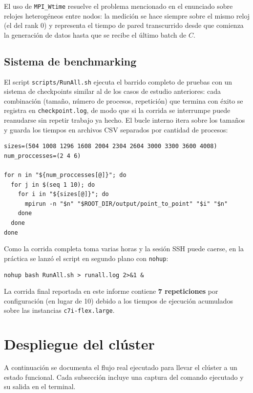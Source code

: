 \documentclass{article}
\begin{document}
El uso de \texttt{MPI\_Wtime} resuelve el problema mencionado en el enunciado sobre relojes heterogéneos entre nodos: la medición se hace siempre sobre el mismo reloj (el del rank 0) y representa el tiempo de pared transcurrido desde que comienza la generación de datos hasta que se recibe el último batch de $C$.

\subsection{Sistema de benchmarking}

El script \texttt{scripts/RunAll.sh} ejecuta el barrido completo de pruebas con un sistema de checkpoints similar al de los casos de estudio anteriores: cada combinación (tamaño, número de procesos, repetición) que termina con éxito se registra en \texttt{checkpoint.log}, de modo que si la corrida se interrumpe puede reanudarse sin repetir trabajo ya hecho. El bucle interno itera sobre los tamaños y guarda los tiempos en archivos CSV separados por cantidad de procesos:

\begin{verbatim}
sizes=(504 1008 1296 1608 2004 2304 2604 3000 3300 3600 4008)
num_proccesses=(2 4 6)

for n in "${num_proccesses[@]}"; do
  for j in $(seq 1 10); do
    for i in "${sizes[@]}"; do
      mpirun -n "$n" "$ROOT_DIR/output/point_to_point" "$i" "$n"
    done
  done
done
\end{verbatim}

Como la corrida completa toma varias horas y la sesión SSH puede caerse, en la práctica se lanzó el script en segundo plano con \texttt{nohup}:

\begin{verbatim}
nohup bash RunAll.sh > runall.log 2>&1 &
\end{verbatim}

La corrida final reportada en este informe contiene \textbf{7 repeticiones} por configuración (en lugar de 10) debido a los tiempos de ejecución acumulados sobre las instancias \texttt{c7i-flex.large}.

\section{Despliegue del clúster}

A continuación se documenta el flujo real ejecutado para llevar el clúster a un estado funcional. Cada subsección incluye una captura del comando ejecutado y su salida en el terminal.
\end{document}
